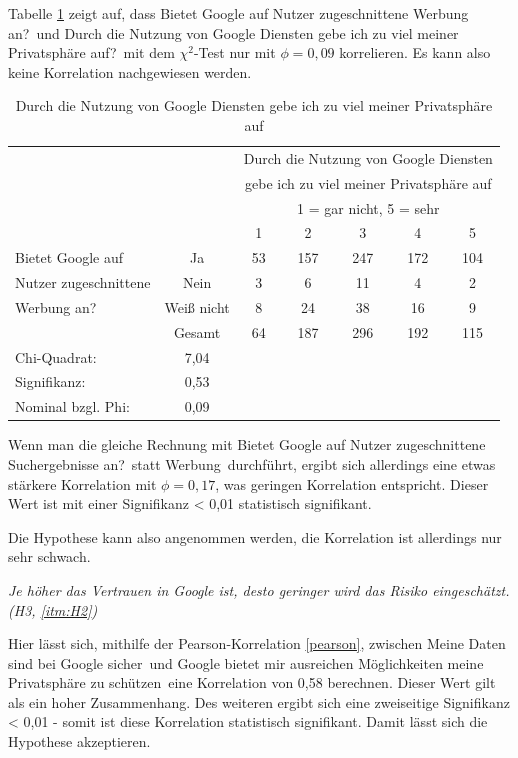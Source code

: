 Tabelle \ref{4sadsprivacy} zeigt auf, dass \glqq Bietet Google auf Nutzer zugeschnittene Werbung an?\grqq\ und \glqq Durch die Nutzung von Google Diensten gebe ich zu viel meiner Privatsphäre auf?\grqq\ mit dem $\chi^2$-Test nur mit $\phi = 0,09$ korrelieren. Es kann also keine Korrelation nachgewiesen werden.
\begin{table}
	\begin{tabular}[]{l c | c | c | c | c | c }
	& & \multicolumn{5}{c}{Durch die Nutzung von Google Diensten}\\
	& & \multicolumn{5}{c}{gebe ich zu viel meiner Privatsphäre auf}\\\hline
	& & \multicolumn{5}{c}{1 = gar nicht, 5 = sehr}\\\hline
	& & 1 & 2 & 3 & 4 & 5\\\hline
	Bietet Google auf & Ja & 53 & 157 & 247 & 172 & 104 \\
	Nutzer zugeschnittene & Nein & 3 & 6 & 11 & 4 & 2 \\
	Werbung an? & Weiß nicht & 8 & 24 & 38 & 16 & 9 \\
	& Gesamt & 64 & 187 & 296 & 192 & 115\\ \hline \hline
	Chi-Quadrat: & 7,04 & & & & &\\
	Signifikanz: & 0,53 & & & & &\\
	Nominal bzgl. Phi: & 0,09&&&&&\\ \hline
	\end{tabular}
	\caption{Durch die Nutzung von Google Diensten gebe ich zu viel meiner Privatsphäre auf}\label{4sadsprivacy}
\end{table}

Wenn man die gleiche Rechnung mit \glqq Bietet Google auf Nutzer zugeschnittene Suchergebnisse an?\grqq\ statt \glqq Werbung\grqq\ durchführt, ergibt sich allerdings eine etwas stärkere Korrelation mit $\phi = 0,17$, was geringen Korrelation entspricht. Dieser Wert ist mit einer Signifikanz < 0,01 statistisch signifikant.

Die Hypothese kann also angenommen werden, die Korrelation ist allerdings nur sehr schwach.

\textit{Je höher das Vertrauen in Google ist, desto geringer wird das Risiko eingeschätzt. (H3, \ref{itm:H2})}

Hier lässt sich, mithilfe der Pearson-Korrelation \ref{pearson}, zwischen \glqq Meine Daten sind bei Google sicher\grqq\ und \glqq Google bietet mir ausreichen Möglichkeiten meine Privatsphäre zu schützen\grqq\ eine Korrelation von 0,58 berechnen. Dieser Wert gilt als ein hoher Zusammenhang. Des weiteren ergibt sich eine zweiseitige Signifikanz < 0,01 - somit ist diese Korrelation statistisch signifikant. Damit lässt sich die Hypothese akzeptieren.


